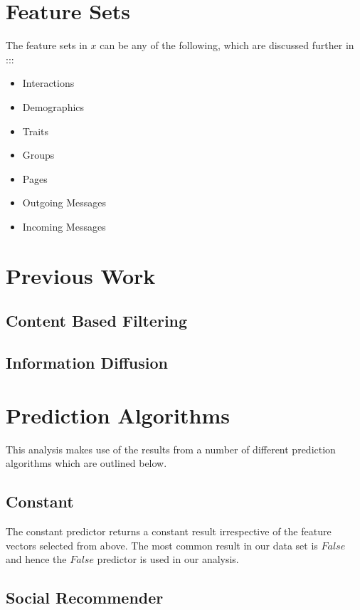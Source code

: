 \section{Feature Sets}
\label{sec:features}

The feature sets in $x$ can be any of the following, which are discussed further in :::

\begin{itemize}
\item Interactions
\item Demographics
\item Traits
\item Groups
\item Pages
\item Outgoing Messages
\item Incoming Messages
\end{itemize}

\section{Previous Work}
\label{sec:pw}

\subsection{Content Based Filtering}
\label{sec:cbf}

\subsection{Information Diffusion}
\label{sec:id}

\section{Prediction Algorithms}
\label{sec:meth}

This analysis makes use of the results from a number of different prediction algorithms which are outlined below.

\subsection{Constant}
\label{sec:const}

The constant predictor returns a constant result irrespective of the feature vectors selected from above. The most common result in our data
set is $False$ and hence the $False$ predictor is used in our analysis.

\subsection{Social Recommender}
\label{sec:sr}

